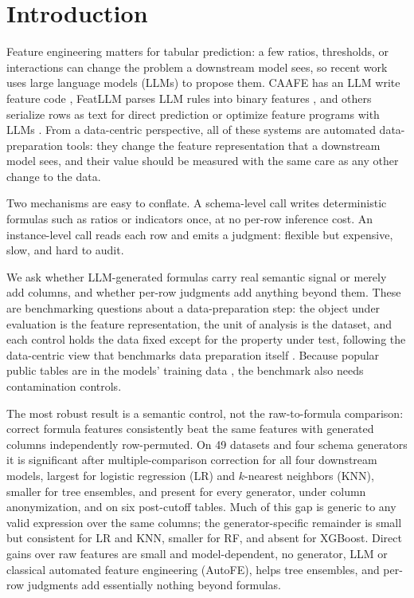 \section{Introduction}\label{sec:intro}

Feature engineering matters for tabular prediction: a few ratios, thresholds, or interactions can change the problem a downstream model sees, so recent work uses large language models (LLMs) to propose them. CAAFE has an LLM write feature code \citep{hollmann2023caafe}, FeatLLM parses LLM rules into binary features \citep{han2024featllm}, and others serialize rows as text for direct prediction \citep{hegselmann2023tabllm} or optimize feature programs with LLMs \citep{abhyankar2026llmfe,nam2024octree}. From a data-centric perspective, all of these systems are automated data-preparation tools: they change the feature representation that a downstream model sees, and their value should be measured with the same care as any other change to the data.

Two mechanisms are easy to conflate. A schema-level call writes deterministic formulas such as ratios or indicators once, at no per-row inference cost. An instance-level call reads each row and emits a judgment: flexible but expensive, slow, and hard to audit.

We ask whether LLM-generated formulas carry real semantic signal or merely add columns, and whether per-row judgments add anything beyond them. These are benchmarking questions about a data-preparation step: the object under evaluation is the feature representation, the unit of analysis is the dataset, and each control holds the data fixed except for the property under test, following the data-centric view that benchmarks data preparation itself \citep{zha2025datacentric,mazumder2023dataperf,tschalzev2024datacentric}. Because popular public tables are in the models' training data \citep{bordt2024elephants}, the benchmark also needs contamination controls.

The most robust result is a semantic control, not the raw-to-formula comparison: correct formula features consistently beat the same features with generated columns independently row-permuted. On 49 datasets and four schema generators it is significant after multiple-comparison correction for all four downstream models, largest for logistic regression (LR) and \(k\)-nearest neighbors (KNN), smaller for tree ensembles, and present for every generator, under column anonymization, and on six post-cutoff tables. Much of this gap is generic to any valid expression over the same columns; the generator-specific remainder is small but consistent for LR and KNN, smaller for RF, and absent for XGBoost. Direct gains over raw features are small and model-dependent, no generator, LLM or classical automated feature engineering (AutoFE), helps tree ensembles, and per-row judgments add essentially nothing beyond formulas.


